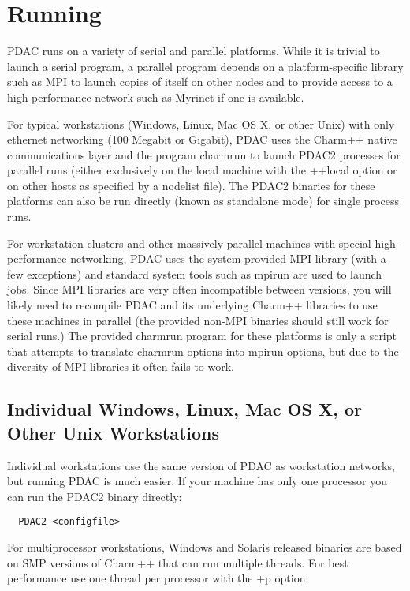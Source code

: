 \section{Running \PDAC}
\label{section:run}

PDAC runs on a variety of serial and parallel platforms.  While it is
trivial to launch a serial program, a parallel program depends on a
platform-specific library such as MPI to launch copies of itself on
other nodes and to provide access to a high performance network such
as Myrinet if one is available.

For typical workstations (Windows, Linux, Mac OS X, or other Unix)
with only ethernet networking (100 Megabit or Gigabit), PDAC uses the
Charm++ native communications layer and the program charmrun to launch
PDAC2 processes for parallel runs (either exclusively on the local
machine with the ++local option or on other hosts as specified by a
nodelist file).  The PDAC2 binaries for these platforms can also be
run directly (known as standalone mode) for single process runs.

For workstation clusters and other massively parallel machines with
special high-performance networking, PDAC uses the system-provided
MPI library (with a few exceptions) and standard system tools such as
mpirun are used to launch jobs.  Since MPI libraries are very often
incompatible between versions, you will likely need to recompile PDAC
and its underlying Charm++ libraries to use these machines in parallel
(the provided non-MPI binaries should still work for serial runs.)
The provided charmrun program for these platforms is only a script
that attempts to translate charmrun options into mpirun options, but
due to the diversity of MPI libraries it often fails to work.

\subsection{Individual Windows, Linux, Mac OS X, or Other Unix Workstations}

Individual workstations use the same version of PDAC as workstation
networks, but running PDAC is much easier.  If your machine has only
one processor you can run the PDAC2 binary directly:

\begin{verbatim}
  PDAC2 <configfile>
\end{verbatim}

For multiprocessor workstations, Windows and Solaris released binaries
are based on SMP versions of Charm++ that can run multiple threads.
For best performance use one thread per processor with the +p option:

